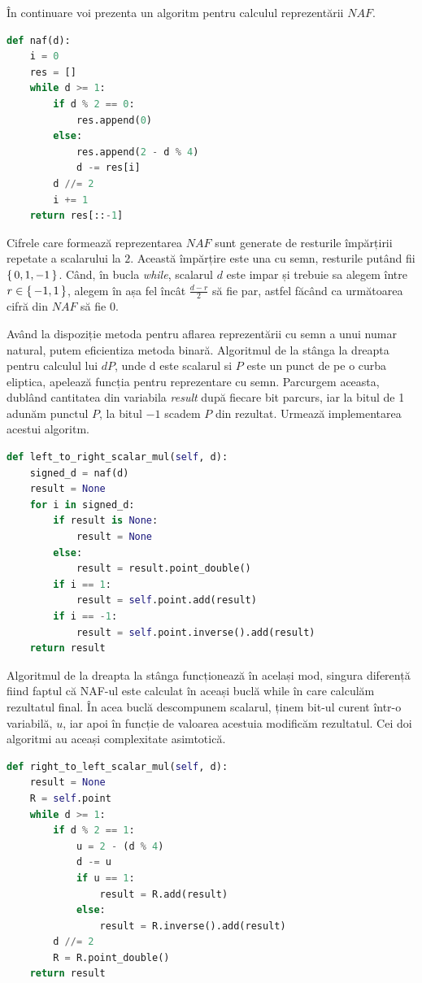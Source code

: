 În continuare voi prezenta un algoritm pentru calculul reprezentării $NAF$. \\

\begin{lstlisting}[language=Python]
def naf(d):
    i = 0
    res = []
    while d >= 1:
        if d % 2 == 0:
            res.append(0)
        else:
            res.append(2 - d % 4)
            d -= res[i]
        d //= 2
        i += 1
    return res[::-1]
\end{lstlisting}

Cifrele care formează reprezentarea  $NAF$ sunt generate de resturile împărțirii repetate a scalarului la $2$. Această împărțire este una cu semn, resturile putând fii $\set{0, 1, -1}$. Când, în bucla \textit{while}, scalarul $d$ este impar și trebuie sa alegem între $r\in\set{-1, 1}$, alegem în așa fel încât $\frac{d-r}{2}$ să fie par, astfel făcând ca următoarea cifră din $NAF$ să fie $0$.

Având la dispoziție metoda pentru aflarea reprezentării cu semn a unui numar natural, putem eficientiza metoda binară. Algoritmul de la stânga la dreapta pentru calculul lui $dP$, unde d este scalarul si $P$ este un punct de pe o curba eliptica, apelează funcția pentru reprezentare cu semn. Parcurgem aceasta, dublând cantitatea din variabila \textit{result} după fiecare bit parcurs, iar la bitul de 1 adunăm punctul $P$, la bitul $-1$ scadem $P$ din rezultat. Urmează implementarea acestui algoritm.

\begin{lstlisting}[language=Python]
def left_to_right_scalar_mul(self, d):
    signed_d = naf(d)
    result = None
    for i in signed_d:
        if result is None:
            result = None
        else:
            result = result.point_double()
        if i == 1:
            result = self.point.add(result)
        if i == -1:
            result = self.point.inverse().add(result)
    return result
\end{lstlisting}

Algoritmul de la dreapta la stânga funcționează în același mod, singura diferență fiind faptul că NAF-ul este calculat în aceași buclă while în care calculăm rezultatul final. În acea buclă descompunem scalarul, ținem bit-ul curent într-o variabilă, $u$, iar apoi în funcție de valoarea acestuia modificăm rezultatul. Cei doi algoritmi au aceași complexitate asimtotică.

\begin{lstlisting}[language=Python]
def right_to_left_scalar_mul(self, d):
    result = None
    R = self.point
    while d >= 1:
        if d % 2 == 1:
            u = 2 - (d % 4)
            d -= u
            if u == 1:
                result = R.add(result)
            else:
                result = R.inverse().add(result)
        d //= 2
        R = R.point_double()
    return result
\end{lstlisting}

